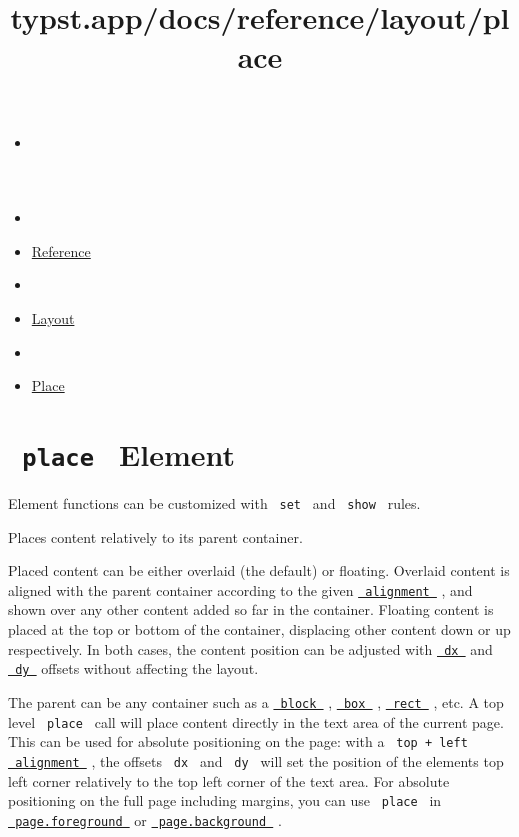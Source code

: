 \title{typst.app/docs/reference/layout/place}

\begin{itemize}
\tightlist
\item
  \href{/docs}{}
\item
  
\item
  \href{/docs/reference/}{Reference}
\item
  
\item
  \href{/docs/reference/layout/}{Layout}
\item
  
\item
  \href{/docs/reference/layout/place/}{Place}
\end{itemize}

\section{\texorpdfstring{\texttt{\ place\ } {{ Element
}}}{ place   Element }}\label{summary}

\label{element-tooltip}
Element functions can be customized with \texttt{\ set\ } and
\texttt{\ show\ } rules.

Places content relatively to its parent container.

Placed content can be either overlaid (the default) or floating.
Overlaid content is aligned with the parent container according to the
given
\href{/docs/reference/layout/place/\#parameters-alignment}{\texttt{\ alignment\ }}
, and shown over any other content added so far in the container.
Floating content is placed at the top or bottom of the container,
displacing other content down or up respectively. In both cases, the
content position can be adjusted with
\href{/docs/reference/layout/place/\#parameters-dx}{\texttt{\ dx\ }} and
\href{/docs/reference/layout/place/\#parameters-dy}{\texttt{\ dy\ }}
offsets without affecting the layout.

The parent can be any container such as a
\href{/docs/reference/layout/block/}{\texttt{\ block\ }} ,
\href{/docs/reference/layout/box/}{\texttt{\ box\ }} ,
\href{/docs/reference/visualize/rect/}{\texttt{\ rect\ }} , etc. A top
level \texttt{\ place\ } call will place content directly in the text
area of the current page. This can be used for absolute positioning on
the page: with a \texttt{\ top\ +\ left\ }
\href{/docs/reference/layout/place/\#parameters-alignment}{\texttt{\ alignment\ }}
, the offsets \texttt{\ dx\ } and \texttt{\ dy\ } will set the position
of the element\textquotesingle s top left corner relatively to the top
left corner of the text area. For absolute positioning on the full page
including margins, you can use \texttt{\ place\ } in
\href{/docs/reference/layout/page/\#parameters-foreground}{\texttt{\ page.foreground\ }}
or
\href{/docs/reference/layout/page/\#parameters-background}{\texttt{\ page.background\ }}
.

